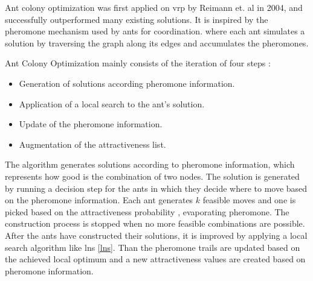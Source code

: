 Ant colony optimization was first applied on \gls{vrp} by Reimann et. al \cite{aco} in 2004, and successfully outperformed many existing solutions. It is inspired by the pheromone mechanism used by ants for coordination. where each ant simulates a solution by traversing the graph along its edges and accumulates the pheromones.

Ant Colony Optimization mainly consists of the iteration of four steps \cite{aco}: 
\begin{itemize}
        \item Generation of solutions according pheromone information.
        \item Application of a local search to the ant's solution.
        \item Update of the pheromone information.
        \item Augmentation of the attractiveness list.
\end{itemize}

The algorithm generates solutions according to pheromone information, which represents how good is the combination of two nodes. The solution is generated by running a decision step for the ants in which they decide where to move based on the pheromone information. Each ant generates $k$ feasible moves and one is picked based on the attractiveness probability \cite{aco}, evaporating pheromone. The construction process is stopped when no more feasible combinations are possible. After the ants have constructed their solutions, it is improved by applying a local search algorithm like \gls{lns} \ref{lns}. Than the pheromone trails are updated based on the achieved local optimum \cite{aso-rank} and a new attractiveness values are created based on pheromone information.
